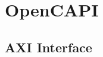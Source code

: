 \graphicspath{ {images/} }

\section{OpenCAPI} \label{section_opencapi}

\subsection{AXI Interface}

%
